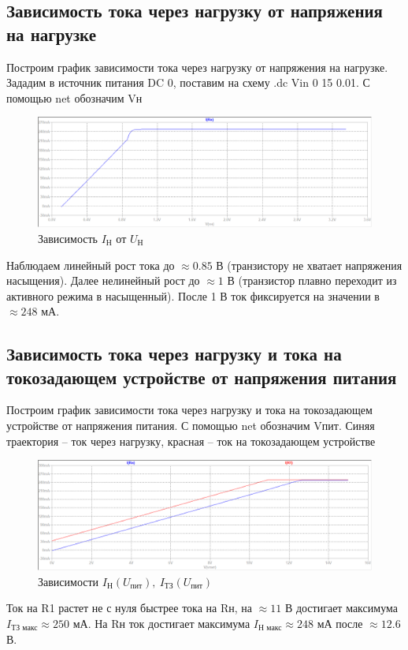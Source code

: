 \documentclass[a4paper, 12pt]{article}
\begin{document}
    \subsection{Зависимость тока через нагрузку от напряжения на нагрузке}
    Построим график зависимости тока через нагрузку от напряжения на нагрузке.
    Зададим в источник питания DC 0, поставим на схему .dc Vin 0 15 0.01.
    С помощью net обозначим Vн
    \begin{figure}[H]
        \centering
        \includegraphics[scale=0.46]{3task_Iн(Vн).png}
        \captionsetup{skip=0pt}
        \caption{Зависимость $I_\text{Н}$ от $U_\text{Н}$}
        \label{fig:3task_InVn}
    \end{figure}
    \noindent Наблюдаем линейный рост тока до $\approx0.85$ В (транзистору не хватает напряжения насыщения).
    Далее нелинейный рост до $\approx1$ В (транзистор плавно переходит из активного режима в насыщенный).
    После 1 В ток фиксируется на значении в $\approx248$ мА.


    \subsection{Зависимость тока через нагрузку и тока на токозадающем устройстве от напряжения питания}
    Построим график зависимости тока через нагрузку и тока на токозадающем устройстве от напряжения питания.
    С помощью net обозначим Vпит. Синяя траектория -- ток через нагрузку,
    красная -- ток на токозадающем устройстве
    \begin{figure}[H]
        \centering
        \includegraphics[scale=0.46]{3task_Iн(Vпит)_Iтз(Vпит).png}
        \captionsetup{skip=0pt}
        \caption{Зависимости $I_\text{Н}\left( U_\text{пит} \right),\ I_\text{ТЗ}\left( U_\text{пит} \right)$}
        \label{fig:3task_InVl_IlVl}
    \end{figure}
    \noindent Ток на R1 растет не с нуля быстрее тока на Rн, на $\approx11$ В достигает максимума
    $I_\text{ТЗ макс}\approx250$ мА. На Rн ток достигает максимума $I_\text{Н макс}\approx248$ мА после $\approx12.6$ В.
\end{document}
